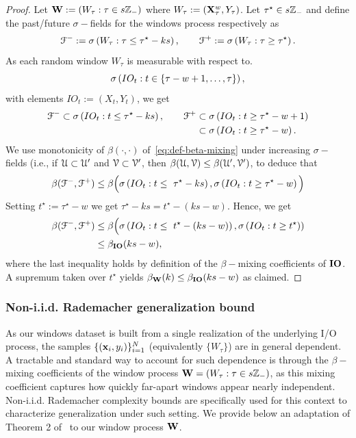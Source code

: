 \begin{proof}
Let ${\mathbf{W}} := (W_\tau: \tau \in s {\mathbb{Z}}_-)$ where $W_\tau := ({\mathbf{X}}_\tau^w, Y_\tau)$. Let $\tau^\star \in s {\mathbb{Z}}_-$ and define the past/future $\sigma-$fields for the windows process respectively as
\begin{equation*}
    {\mathcal{F}}^- := \sigma\left(W_\tau: \tau \leq \tau^\star - ks\right), \qquad {\mathcal{F}}^+ := \sigma\left(W_\tau: \tau \geq \tau^\star\right).
\end{equation*}
As each random window $W_\tau$ is measurable with respect to. $$\sigma\left(IO_t : t \in \{\tau - w + 1, \ldots, \tau\}\right),$$ with elements $IO_t := (X_t, Y_t)$, we get 
\begin{equation*}
\begin{aligned}
    {\mathcal{F}}^- \subset \sigma\left(IO_t : t \leq \tau^\star - ks\right), \qquad {\mathcal{F}}^+ &\subset \sigma\left(IO_t : t \geq \tau^\star - w + 1\right)\\
    &\subset \sigma\left(IO_t : t \geq \tau^\star - w\right).
\end{aligned}
\end{equation*}
We use monotonicity of $\beta(\cdot, \cdot)$ of~\cref{eq:def-beta-mixing} under increasing $\sigma-$fields (i.e., if ${\mathcal{U}} \subset {\mathcal{U}}'$ and ${\mathcal{V}} \subset {\mathcal{V}}'$, then $\beta({\mathcal{U}}, {\mathcal{V}}) \leq \beta({\mathcal{U}}', {\mathcal{V}}')$, to deduce that
\begin{equation*}
    \beta({\mathcal{F}}^-, {\mathcal{F}}^+) \leq \beta\Big(\sigma\left(IO_t : t \leq \ \tau^\star - ks\right), \sigma\left(IO_t : t \geq \tau^\star - w\right)\Big)
\end{equation*}
Setting $t^\star := \tau^\star - w$ we get $\tau^\star - ks = t^\star - (ks - w)$. Hence, we get
\begin{equation*}
\begin{aligned}
    \beta(\gF^-, \gF^+) &\leq \beta\Big(\sigma\pth{IO_t : t \leq \ t^\star - (ks - w)}, \sigma\pth{IO_t : t \geq t^\star}) \\
    &\leq \beta_{\rmIO}(ks - w),
\end{aligned}
\end{equation*}
where the last inequality holds by definition of the $\beta-$mixing coefficients of $\mathbf{IO}$. A supremum taken over $t^\star$ yields $\beta_{{\mathbf{W}}}(k) \leq \beta_{\mathbf{IO}}(ks - w)$ as claimed.
\end{proof}

\subsubsection{Non-i.i.d. Rademacher generalization bound}\label{subsubsec:non-iid-rademacher-generalization}
As our windows dataset is built from a single realization of the underlying I/O process, the samples $\{({\mathbf{x}}_i, y_i)\}_{i=1}^N$ (equivalently $\{W_\tau\}$) are in general dependent. A tractable and standard way to account for such dependence is through the $\beta-$mixing coefficients of the window process ${\mathbf{W}} = (W_\tau : \tau \in s {\mathbb{Z}}_-)$, as this mixing coefficient captures how quickly far-apart windows appear nearly independent. Non-i.i.d. Rademacher complexity bounds are specifically used for this context to characterize generalization under such setting. 
We provide below an adaptation of Theorem 2 of~\cite{mohri2008rademacher} to our window process ${\mathbf{W}}$.

